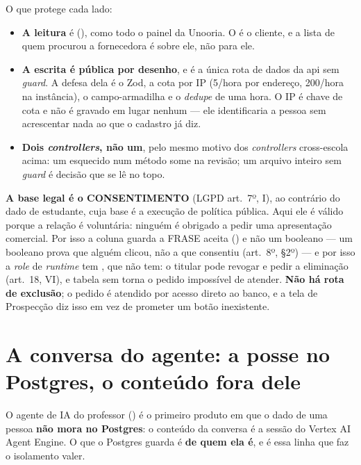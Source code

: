 O que protege cada lado:

\begin{itemize}
  \item \textbf{A leitura} é  (), como todo o
    painel da Unooria. O  é o cliente, e a lista de quem
    procurou a fornecedora é sobre ele, não para ele.
  \item \textbf{A escrita é pública por desenho}, e é a única rota de dados da
    api sem \emph{guard}. A defesa dela é o Zod, a cota por IP
    (\num{5}/hora por endereço, \num{200}/hora na instância), o campo-armadilha
    e o \emph{dedupe} de uma hora. O IP é chave de cota e não é gravado em lugar
    nenhum --- ele identificaria a pessoa sem acrescentar nada ao que o
    cadastro já diz.
  \item \textbf{Dois \emph{controllers}, não um}, pelo mesmo motivo dos
    \emph{controllers} cross-escola acima: um  esquecido num
    método some na revisão; um arquivo inteiro sem \emph{guard} é decisão que se
    lê no topo.
\end{itemize}

\textbf{A base legal é o CONSENTIMENTO} (LGPD art.~7º, I), ao contrário do dado
de estudante, cuja base é a execução de política pública. Aqui ele é válido
porque a relação é voluntária: ninguém é obrigado a pedir uma apresentação
comercial. Por isso a coluna guarda a FRASE aceita () e
não um booleano --- um booleano prova que alguém clicou, não a que consentiu
(art.~8º, §2º) --- e por isso a \emph{role} de \emph{runtime} tem ,
que  não tem: o titular pode revogar e pedir a eliminação
(art.~18, VI), e tabela sem  torna o pedido impossível de atender.
\textbf{Não há rota de exclusão}; o pedido é atendido por acesso direto ao
banco, e a tela de Prospecção diz isso em vez de prometer um botão inexistente.

\section{A conversa do agente: a posse no Postgres, o conteúdo fora dele}
\label{sec:agente-professor-posse}

O agente de IA do professor () é o primeiro produto em que o dado
de uma pessoa \textbf{não mora no Postgres}: o conteúdo da conversa é a sessão do
Vertex AI Agent Engine. O que o Postgres guarda é \textbf{de quem ela é}, e é essa
linha que faz o isolamento valer.


